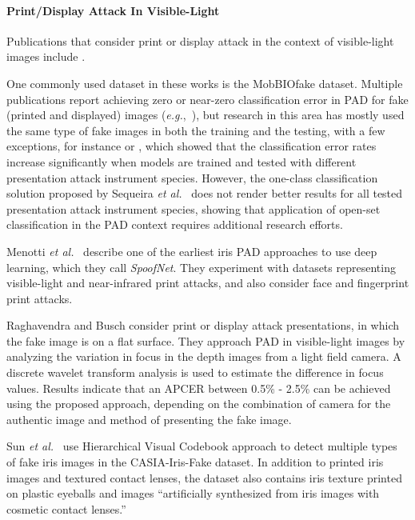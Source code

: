 \documentclass[format=acmsmall, review=false, timestamp=false]{acmart}
\newcommand{\eg}{{\it e.g.},~}
\newcommand{\etal}{{\it et al.}~}
\begin{document}
\paragraph{Print/Display Attack In Visible-Light}
Publications that consider print or display attack in the context of visible-light images include {\cite{Akhtar_AVSS_2014,Akhtar_ICCST_2014,Alonso-Fernandez_MIPRO_2014,Das_PRL_2016,Gragnaniell_PRL_2015,Menotti_TIFS_2015,Raghavendra_TIFS_2015,Raja_SIN_2016,Sequeira_VISAPPa_2014,Sequeira_IJCNN_2014,Sequeira_TSP_2016}}.

One commonly used dataset in these works is the {\sf MobBIOfake} dataset. Multiple publications report achieving zero or near-zero classification error in PAD for {fake (printed and displayed) images} (\eg \cite{Gragnaniell_PRL_2015}), but research in this area has mostly used the same type of {fake} images in both the training and the testing, {with a few exceptions, for instance \cite{Sequeira_TSP_2016} or \cite{Yambay_IJCB_2017}, which showed that the classification error rates increase significantly when models are trained and tested with different presentation attack instrument species. However, the one-class classification solution proposed by Sequeira \etal \cite{Sequeira_TSP_2016} does not render better results for all tested  presentation attack instrument species, showing that application of open-set classification in the PAD context requires additional research efforts.}

Menotti \etal \cite{Menotti_TIFS_2015} describe one of the earliest iris PAD approaches to use deep learning, which they call {\it SpoofNet}. They experiment with datasets representing visible-light and near-{infrared} print attacks, and also consider face and fingerprint print attacks.

{Raghavendra and Busch
\cite{Raghavendra_IJCB_2014} consider print or display attack presentations, in which the fake image is on a flat surface. They approach PAD in visible-light images by analyzing the variation in focus in the depth images from a light field camera. A discrete wavelet transform analysis is used to estimate the difference in focus values. Results indicate that an APCER between 0.5\% - 2.5\% can be achieved using the proposed approach, depending on the combination of camera for the authentic image and method of presenting the fake image.}

Sun \etal \cite{Sun_PAMI_2014} use Hierarchical Visual Codebook approach to detect multiple types of fake iris images in the {\sf CASIA-Iris-Fake} dataset. In addition to printed iris images and textured contact lenses, the dataset also contains iris texture printed on plastic eyeballs and images ``artificially synthesized from iris images with cosmetic contact lenses.'' 
\end{document}
